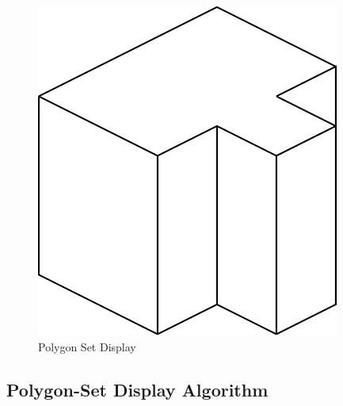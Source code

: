 \begin{enumerate}
        \begin{figure}[htbp]
	\hspace{2cm}           
            \includegraphics{PSETDISP.pdf}
            \caption{Polygon Set Display}
            \label{psetdisp}
        \end{figure}
 
	\end{enumerate}


	\subsection{Polygon-Set Display Algorithm}
	\label{psetalgo}

